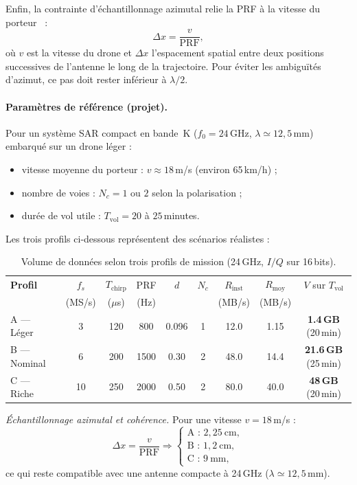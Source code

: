 Enfin, la contrainte d’échantillonnage azimutal relie la PRF à la vitesse du porteur~\cite{cumming2005,richards2010} :
\[
\Delta x = \frac{v}{\mathrm{PRF}},
\]
où $v$ est la vitesse du drone et $\Delta x$ l’espacement spatial entre deux positions successives de l’antenne le long de la trajectoire.  
Pour éviter les ambiguïtés d’azimut, ce pas doit rester inférieur à $\lambda/2$.

\paragraph{Paramètres de référence (projet).}
Pour un système SAR compact en bande~K ($f_0=24$\,GHz, $\lambda\simeq12{,}5$\,mm) embarqué sur un drone léger :
\begin{itemize}
  \item vitesse moyenne du porteur : $v \approx 18$\,m/s (environ 65\,km/h) ;
  \item nombre de voies : $N_c=1$ ou $2$ selon la polarisation ;
  \item durée de vol utile : $T_{\mathrm{vol}}=20$ à $25$\,minutes.
\end{itemize}
Les trois profils ci-dessous représentent des scénarios réalistes :

\begin{table}[H]
\centering
\caption{Volume de données selon trois profils de mission (24\,GHz, $I/Q$ sur 16\,bits).}
\label{tab:volume_donnees_vol_24ghz}
\renewcommand{\arraystretch}{1.1}
\begin{tabular}{@{}lcccccccc@{}}
\toprule
\textbf{Profil} & $f_s$ & $T_{\mathrm{chirp}}$ & PRF & $d$ & $N_c$ & $R_{\mathrm{inst}}$ & $R_{\mathrm{moy}}$ & $V$ sur $T_{\mathrm{vol}}$ \\
 & (MS/s) & ($\mu$s) & (Hz) &  &  & (MB/s) & (MB/s) &  \\ \midrule
A — Léger   & 3  & 120 & 800  & 0.096 & 1 & 12.0 & 1.15 & \textbf{1.4\,GB} (20\,min) \\
B — Nominal & 6  & 200 & 1500 & 0.30  & 2 & 48.0 & 14.4 & \textbf{21.6\,GB} (25\,min) \\
C — Riche   & 10 & 250 & 2000 & 0.50  & 2 & 80.0 & 40.0 & \textbf{48\,GB}  (20\,min) \\
\bottomrule
\end{tabular}
\end{table}

\noindent\textit{Échantillonnage azimutal et cohérence.}  
Pour une vitesse $v=18$\,m/s :
\[
\Delta x = \frac{v}{\mathrm{PRF}} \Rightarrow
\begin{cases}
\text{A : } 2{,}25~\mathrm{cm},\\
\text{B : } 1{,}2~\mathrm{cm},\\
\text{C : } 9~\mathrm{mm},
\end{cases}
\]
ce qui reste compatible avec une antenne compacte à 24\,GHz ($\lambda\simeq12{,}5$\,mm).

